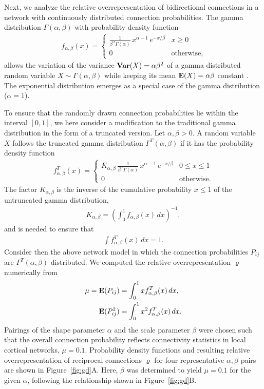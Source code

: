 
Next, we analyze the relative overrepresentation of bidirectional
connections in a network with continuously distributed connection
probabilities. The gamma distribution $\Gamma(\alpha, \beta)$ with
probability density function
\begin{align}
    f_{\alpha,\beta}(x) = \begin{cases} 
\frac{1}{\beta^{\alpha}\Gamma(\alpha)}\, x^{\alpha-1}\,e^{-x/\beta} & x \geq 0 \\
0 & \text{otherwise},
\end{cases}
\end{align}
allows the variation of the variance $\operatorname{\mathbf{Var}}(X)= \alpha \beta^2 $ of a
gamma distributed random variable $X \sim \Gamma(\alpha, \beta)$ while
keeping its mean $\operatorname{\mathbf{E}}(X) = \alpha \beta $ constant \cite{Hogg1978}.
The exponential distribution emerges as a special case of the gamma
distribution ($\alpha =1$).

To ensure that the randomly drawn connection probabilities lie within the
interval $[0,1]$, we here consider a modification to the
traditional gamma distribution in the form of a truncated version. Let
$\alpha, \beta > 0$. A random variable $X$ follows the truncated gamma
distribution $\Gamma^T(\alpha, \beta)$ if it has the probability
density function
%
\begin{align}
  f_{\alpha,\beta}^T(x) = \begin{cases} K_{\alpha, \beta}\,
\frac{1}{\beta^{\alpha}\Gamma(\alpha)}\, x^{\alpha-1}\,e^{-x/\beta} & 0 \leq x \leq 1 \\
0 & \text{otherwise}.
\end{cases}
\end{align}
%
The factor $K_{\alpha,\beta}$ is the inverse of the cumulative
probability $x \leq 1$ of the untruncated gamma distribution,
\begin{align}
  K_{\alpha,\beta} = \left(\int_0^{1} f_{\alpha,\beta}(x) \, dx \right)^{-1},
\end{align}
and is needed to ensure that
\begin{align}
  \int f_{\alpha,\beta}^T(x) \,dx = 1 \label{eq:gd1}.
\end{align}
Consider then the above network model in which the connection
probabilities $P_{ij}$ are $\Gamma^T(\alpha, \beta)$ distributed. We
computed the relative overrepresentation $\varrho$ numerically from
\begin{align}
  \mu = \operatorname{\mathbf{E}}(P_{ij}) &= \int_0^1 x f_{\alpha,\beta}^T(x)\, dx,\\
        \operatorname{\mathbf{E}}(P_{ij}^2) &= \int_0^1 x^2 f_{\alpha,\beta}^T(x)\, dx.
\end{align}
%
Pairings of the shape parameter $\alpha$ and the scale parameter
$\beta$ were chosen such that the overall connection probability
reflects connectivity statistics in local cortical networks, $\mu =
0.1$. Probability density functions and resulting relative
overrepresentation of reciprocal connections $\varrho$ for four
representative $\alpha,\beta$ pairs are shown in
Figure~\ref{fig:gd}A. Here, $\beta$ was determined to yield $\mu =
0.1$ for the given $\alpha$, following the relationship shown in
Figure~\ref{fig:gd}B.

